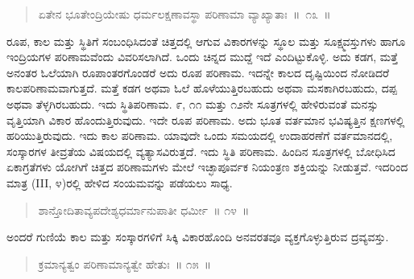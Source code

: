 \begin{verse}
ಏತೇನ ಭೂತೇಂದ್ರಿಯೇಷು ಧರ್ಮಲಕ್ಷಣಾವಸ್ಥಾ ಪರಿಣಾಮಾ ವ್ಯಾಖ್ಯಾತಾಃ~॥~೧೩~॥
\end{verse}

\vspace{-0.4cm}


\vskip 0.2cm

ರೂಪ, ಕಾಲ ಮತ್ತು ಸ್ಥಿತಿಗೆ ಸಂಬಂಧಿಸಿದಂತೆ ಚಿತ್ತದಲ್ಲಿ ಆಗುವ ವಿಕಾರಗಳನ್ನು ಸ್ಥೂಲ ಮತ್ತು ಸೂಕ್ಷ್ಮವಸ್ತುಗಳು ಹಾಗೂ ಇಂದ್ರಿಯಗಳ ಪರಿಣಾಮವೆಂದು ವಿವರಿಸಲಾಗಿದೆ. ಒಂದು ಚಿನ್ನದ ಮುದ್ದೆ ಇದೆ ಎಂದಿಟ್ಟುಕೊಳ್ಳಿ. ಅದು ಕಡಗ, ಮತ್ತೆ ಅನಂತರ ಓಲೆಯಾಗಿ ರೂಪಾಂತರಗೊಂಡರೆ ಅದು ರೂಪ ಪರಿಣಾಮ. ಇದನ್ನೇ ಕಾಲದ ದೃಷ್ಟಿಯಿಂದ ನೋಡಿದರೆ ಕಾಲಪರಿಣಾಮವಾಗುತ್ತದೆ. ಮತ್ತೆ ಕಡಗ ಅಥವಾ ಓಲೆ ಹೊಳೆಯುತ್ತಿರಬಹುದು ಅಥವಾ ಮಸಕಾಗಿರಬಹುದು, ದಪ್ಪ ಅಥವಾ ತೆಳ್ಳಗಿರಬಹುದು. ಇದು ಸ್ಥಿತಿಪರಿಣಾಮ. ೯, ೧೧ ಮತ್ತು ೧೨ನೇ ಸೂತ್ರಗಳಲ್ಲಿ ಹೇಳಿರುವಂತೆ ಮನಸ್ಸು ವೃತ್ತಿಯಾಗಿ ವಿಕಾರ ಹೊಂದುತ್ತಿರುವುದು. ಇದೇ ರೂಪ ಪರಿಣಾಮ. ಅದು ಭೂತ ವರ್ತಮಾನ ಭವಿಷ್ಯತ್ತಿನ ಕ್ಷಣಗಳಲ್ಲಿ ಹರಿಯುತ್ತಿರುವುದು. ಇದು ಕಾಲ ಪರಿಣಾಮ. ಯಾವುದೇ ಒಂದು ಸಮಯದಲ್ಲಿ ಉದಾಹರಣೆಗೆ ವರ್ತಮಾನದಲ್ಲಿ, ಸಂಸ್ಕಾರಗಳ ತೀವ್ರತೆಯ ವಿಷಯದಲ್ಲಿ ವ್ಯತ್ಯಾಸವಿರುತ್ತದೆ. ಇದು ಸ್ಥಿತಿ ಪರಿಣಾಮ. ಹಿಂದಿನ ಸೂತ್ರಗಳಲ್ಲಿ ಬೋಧಿಸಿದ ಏಕಾಗ್ರತೆಗಳು ಯೋಗಿಗೆ ಚಿತ್ತದ ಪರಿಣಾಮಗಳು ಮೇಲೆ ಇಚ್ಛಾಪೂರ್ವಕ ನಿಯಂತ್ರಣ ಶಕ್ತಿಯನ್ನು ನೀಡುತ್ತವೆ. ಇದರಿಂದ ಮಾತ್ರ (III, ೪)ರಲ್ಲಿ ಹೇಳಿದ ಸಂಯಮವನ್ನು ಪಡೆಯಲು ಸಾಧ್ಯ. 

\vspace{-0.2cm}

\begin{verse}
ಶಾನ್ತೋದಿತಾವ್ಯಪದೇಶ್ಯಧರ್ಮಾನುಪಾತೀ ಧರ್ಮೀ~॥ ೧೪~॥
\end{verse}

\vspace{-0.4cm}


\vskip 0.2cm

ಅಂದರೆ ಗುಣಿಯೆ ಕಾಲ ಮತ್ತು ಸಂಸ್ಕಾರಗಳಿಗೆ ಸಿಕ್ಕಿ ವಿಕಾರಹೊಂದಿ ಅನವರತವೂ ವ್ಯಕ್ತಗೊಳ್ಳುತ್ತಿರುವ ದ್ರವ್ಯವಸ್ತು. 

\vspace{-0.2cm}

\begin{verse}
ಕ್ರಮಾನ್ಯತ್ವಂ ಪರಿಣಾಮಾನ್ಯತ್ವೇ ಹೇತುಃ~॥ ೧೫~॥
\end{verse}

\vspace{-0.4cm}


\vspace{-0.2cm}

